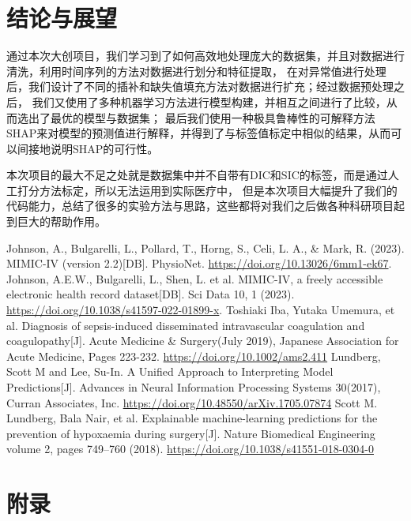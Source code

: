 \documentclass[12pt, a4paper, oneside]{ctexart}
\numberwithin{equation}{section}  %
\begin{document}
\section{结论与展望}
通过本次大创项目，我们学习到了如何高效地处理庞大的数据集，并且对数据进行清洗，利用时间序列的方法对数据进行划分和特征提取，
在对异常值进行处理后，我们设计了不同的插补和缺失值填充方法对数据进行扩充；经过数据预处理之后，
我们又使用了多种机器学习方法进行模型构建，并相互之间进行了比较，从而选出了最优的模型与数据集；
最后我们使用一种极具鲁棒性的可解释方法SHAP来对模型的预测值进行解释，并得到了与标签值标定中相似的结果，从而可以间接地说明SHAP的可行性。

本次项目的最大不足之处就是数据集中并不自带有DIC和SIC的标签，而是通过人工打分方法标定，所以无法运用到实际医疗中，
但是本次项目大幅提升了我们的代码能力，总结了很多的实验方法与思路，这些都将对我们之后做各种科研项目起到巨大的帮助作用。

\clearpage
\begin{thebibliography}{99}
     Johnson, A., Bulgarelli, L., Pollard, T., Horng, S., Celi, L. A., \& Mark, R. (2023). 
    MIMIC-IV (version 2.2)[DB]. PhysioNet. \url{https://doi.org/10.13026/6mm1-ek67}.
     Johnson, A.E.W., Bulgarelli, L., Shen, L. et al. MIMIC-IV, 
    a freely accessible electronic health record dataset[DB]. Sci Data 10, 1 (2023). 
    \url{https://doi.org/10.1038/s41597-022-01899-x}.
     Toshiaki Iba, Yutaka Umemura, et al. 
    Diagnosis of sepsis-induced disseminated intravascular coagulation and coagulopathy[J]. 
    Acute Medicine \& Surgery(July 2019), Japanese Association for Acute Medicine, Pages 223-232.
    \url{https://doi.org/10.1002/ams2.411}
     Lundberg, Scott M and Lee, Su-In. A Unified Approach to Interpreting Model Predictions[J].
    Advances in Neural Information Processing Systems 30(2017), Curran Associates, Inc.
    \url{https://doi.org/10.48550/arXiv.1705.07874}
     Scott M. Lundberg, Bala Nair, et al. 
    Explainable machine-learning predictions for the prevention of hypoxaemia during surgery[J].
    Nature Biomedical Engineering volume 2, pages 749–760 (2018).
    \url{https://doi.org/10.1038/s41551-018-0304-0}
\end{thebibliography}
\clearpage
\appendix
\section{附录}
\end{document}
